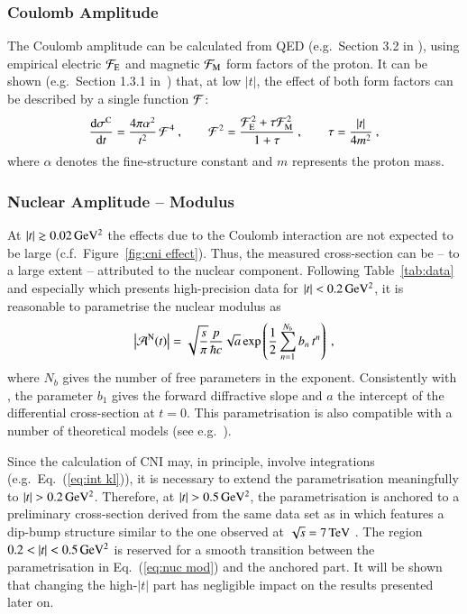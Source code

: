 \subsubsection{Coulomb Amplitude}
\label{sec:cni coulomb}
%
The Coulomb amplitude can be calculated from QED (e.g.~Section 3.2 in \cite{block06}), using empirical electric ${\cal F}_{\rm E}$ and magnetic ${\cal F}_{\rm M}$ form factors of the proton. It can be shown (e.g.~Section 1.3.1 in~\cite{jan_thesis}) that, at low $|t|$, the effect of both form factors can be described by a single function ${\cal F}$:
\begin{equation}
\label{eq:coul cs}
	{\d\sigma^{\rm C}\over \d t} = {4\pi\alpha^2\over t^2}\,{\cal F}^4\ ,\qquad 
	{\cal F}^2 = {{\cal F}_{\rm E}^2 + \tau {\cal F}_{\rm M}^2\over 1 + \tau}\ ,\qquad 
	\tau = {|t|\over 4m^2}\ ,
\end{equation}
where $\alpha$ denotes the fine-structure constant and $m$ represents the proton mass.



\subsubsection{Nuclear Amplitude -- Modulus}
\label{sec:cni nuclear modulus}

At $|t| \gtrsim 0.02\,{\rm GeV^2}$ the effects due to the Coulomb interaction are not expected to be large (c.f.~Figure~\ref{fig:cni effect}). Thus, the measured cross-section can be -- to a large extent -- attributed to the nuclear component. Following Table~\ref{tab:data} and especially \cite{8tev-90m} which presents high-precision data for $|t| < 0.2\,{\rm GeV^2}$, it is reasonable to parametrise the nuclear modulus as
\begin{equation}
\label{eq:nuc mod}
\left | {\cal A}^{\rm N}(t) \right | = \sqrt{s\over\pi} {p\over \hbar c} \sqrt{a} \exp\left( {1\over 2} \sum\limits_{n = 1}^{N_b} b_n\, t^n \right)\ ,
\end{equation}
where $N_b$ gives the number of free parameters in the exponent. Consistently with \cite{8tev-90m}, the parameter $b_1$ gives the forward diffractive slope and $a$ the intercept of the differential cross-section at $t=0$. This parametrisation is also compatible with a number of theoretical models (see e.g.~\cite{elegent}).

Since the calculation of CNI may, in principle, involve integrations (e.g.~Eq.~(\ref{eq:int kl})), it is necessary to extend the parametrisation meaningfully to $|t| > 0.2\,{\rm GeV^2}$. Therefore, at $|t| > 0.5\,{\rm GeV^2}$, the parametrisation is anchored to a preliminary cross-section derived from the same data set as in \cite{8tev-90m} which features a dip-bump structure similar to the one observed at $\sqrt{s} = 7\,{\rm TeV}$ \cite{epl95}. The region $0.2 < |t| < 0.5\,{\rm GeV^2}$ is reserved for a smooth transition between the parametrisation in Eq.~(\ref{eq:nuc mod}) and the anchored part. It will be shown that changing the high-$|t|$ part has negligible impact on the results presented later on.



